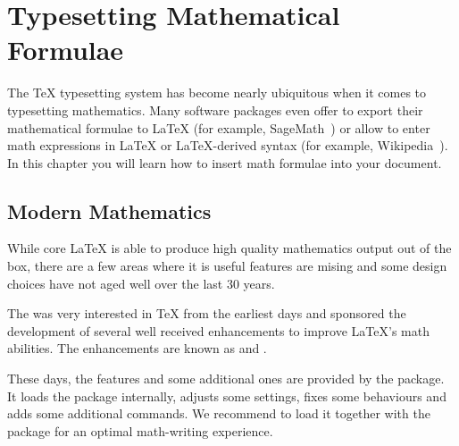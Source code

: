 %
%
%
%


\chapter{Typesetting Mathematical Formulae}\label{chap:math}

\begin{intro}
  The \TeX{} typesetting system has become nearly ubiquitous when it comes to
  typesetting mathematics. Many software packages even offer to export their
  mathematical formulae to \LaTeX{} (for example, SageMath~\cite{sagemath}) or
  allow to enter math expressions in \LaTeX{} or \LaTeX{}-derived syntax (for
  example, Wikipedia~\cite{enwiki:1091087776}). In this chapter you will learn
  how to insert math formulae into your document.
\end{intro}

\section{Modern Mathematics}

While core \LaTeX{} is able to produce high quality mathematics output out of
the box, there are a few areas where it is useful features are mising and some
design choices have not aged well over the last 30 years.

The \emph{} was very interested in \TeX{} from
the earliest days and sponsored the development of several well received
enhancements to improve \LaTeX{}'s math abilities. The enhancements are known as
 and .

These days, the  features and some additional ones are provided by the
 package. It loads the  package internally, adjusts
some settings, fixes some behaviours and adds some additional commands. We
recommend to load it together with the  package for an optimal
math-writing experience.

